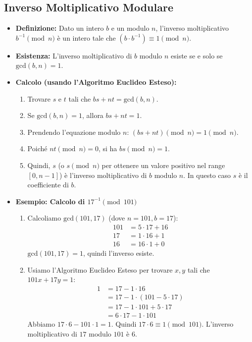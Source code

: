 \subsection{Inverso Moltiplicativo Modulare}
\begin{itemize}
    \item \textbf{Definizione:} Dato un intero \(b\) e un modulo \(n\), l'inverso moltiplicativo \(b^{-1} \pmod{n}\) è un intero tale che \((b \cdot b^{-1}) \equiv 1 \pmod{n}\).
    \item \textbf{Esistenza:} L'inverso moltiplicativo di \(b\) modulo \(n\) esiste se e solo se \(\text{gcd}(b, n) = 1\).
    \item \textbf{Calcolo (usando l'Algoritmo Euclideo Esteso):}
    \begin{enumerate}
        \item Trovare \(s\) e \(t\) tali che \(bs + nt = \text{gcd}(b, n)\).
        \item Se \(\text{gcd}(b, n) = 1\), allora \(bs + nt = 1\).
        \item Prendendo l'equazione modulo \(n\): \((bs + nt) \pmod{n} = 1 \pmod{n}\).
        \item Poiché \(nt \pmod{n} = 0\), si ha \(bs \pmod{n} = 1\).
        \item Quindi, \(s\) (o \(s \pmod{n}\) per ottenere un valore positivo nel range \([0, n-1]\)) è l'inverso moltiplicativo di \(b\) modulo \(n\). In questo caso \(s\) è il coefficiente di \(b\).
    \end{enumerate}
    \item \textbf{Esempio: Calcolo di \(17^{-1} \pmod{101}\)}
    \begin{enumerate}
        \item Calcoliamo \(\text{gcd}(101, 17)\) (dove \(n=101, b=17\)):
        \begin{align*}
            101 &= 5 \cdot 17 + 16 \\
            17 &= 1 \cdot 16 + 1 \\
            16 &= 16 \cdot 1 + 0
        \end{align*}
        \(\text{gcd}(101, 17) = 1\), quindi l'inverso esiste.
        \item Usiamo l'Algoritmo Euclideo Esteso per trovare \(x,y\) tali che \(101x + 17y = 1\):
        \begin{align*}
            1 &= 17 - 1 \cdot 16 \\
              &= 17 - 1 \cdot (101 - 5 \cdot 17) \\
              &= 17 - 1 \cdot 101 + 5 \cdot 17 \\
              &= 6 \cdot 17 - 1 \cdot 101
        \end{align*}
        Abbiamo \(17 \cdot 6 - 101 \cdot 1 = 1\). Quindi \(17 \cdot 6 \equiv 1 \pmod{101}\).
        L'inverso moltiplicativo di \(17\) modulo \(101\) è \(6\).
    \end{enumerate}
\end{itemize}

